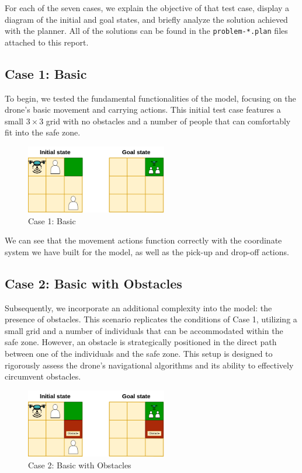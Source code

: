 \documentclass{article}
\begin{document}
For each of the seven cases, we explain the objective of that test case, display a diagram of the initial and goal states, and briefly analyze the solution achieved with the planner. All of the solutions can be found in the \texttt{problem-*.plan} files attached to this report.

\subsection{Case 1: Basic}

To begin, we tested the fundamental functionalities of the model, focusing on the drone's basic movement and carrying actions. This initial test case features a small \(3 \times 3\) grid with no obstacles and a number of people that can comfortably fit into the safe zone.

\begin{figure}[ht]
    \centering
    \includegraphics[width=0.55\textwidth]{assets/problem-1-basic.drawio.png}
    \caption{Case 1: Basic}
    \label{fig:initial-state}
\end{figure}
\FloatBarrier

We can see that the movement actions function correctly with the coordinate system we have built for the model, as well as the pick-up and drop-off actions.

\subsection{Case 2: Basic with Obstacles}

Subsequently, we incorporate an additional complexity into the model: the presence of obstacles. This scenario replicates the conditions of Case 1, utilizing a small grid and a number of individuals that can be accommodated within the safe zone. However, an obstacle is strategically positioned in the direct path between one of the individuals and the safe zone. This setup is designed to rigorously assess the drone's navigational algorithms and its ability to effectively circumvent obstacles.

\begin{figure}[H]
    \centering
    \includegraphics[width=0.55\textwidth]{assets/problem-2-basic-obstacle.drawio.png}
    \caption{Case 2: Basic with Obstacles}
    \label{fig:initial-state-obstacles}
\end{figure}
\FloatBarrier
\end{document}
